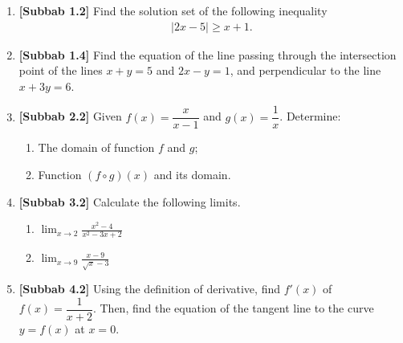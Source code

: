 \documentclass[10pt,openany,a4paper]{article}
\theoremstyle{definition}
\theoremstyle{definition}
\theoremstyle{plain}
\begin{document}
\newpage

\begin{enumerate}
    \item \textbf{[Subbab 1.2]} Find the solution set of the following inequality
    \begin{align*}
        |2x-5|\geq x+1.
    \end{align*}

    \item \textbf{[Subbab 1.4]} Find the equation of the line passing through the intersection point of the lines $x+y=5$ and $2x-y=1$, and perpendicular to the line $x+3y=6$.

    \item \textbf{[Subbab 2.2]} Given $f(x)=\dfrac{x}{x-1}$ and $g(x)=\dfrac{1}{x}$. Determine:
    \begin{enumerate}
        \item[a)] The domain of function $f$ and $g$;
        \item[b)] Function $(f\circ g)(x)$ and its domain.
    \end{enumerate}

    \item \textbf{[Subbab 3.2]} Calculate the following limits.
    \begin{enumerate}
        \item[a.] $\displaystyle\lim_{x\to 2}\frac{x^2-4}{x^2-3x+2}$
        \item[b.] $\displaystyle\lim_{x\to 9}\frac{x-9}{\sqrt{x}-3}$
    \end{enumerate}

    \item \textbf{[Subbab 4.2]} Using the definition of derivative, find $f'(x)$ of $f(x)=\dfrac{1}{x+2}$. Then, find the equation of the tangent line to the curve $y=f(x)$ at $x=0$.
\end{enumerate}

\newpage
\end{document}
